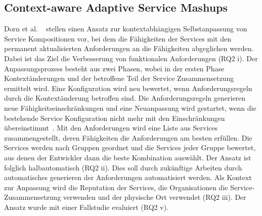 \documentclass[conference,compsoc]{IEEEtran}
\begin{document}
\subsection{Context-aware Adaptive Service Mashups}
Dorn et al. ~\cite{dorn2009context} stellen einen Ansatz zur kontextabhängigen Selbstanpassung von Service Kompositionen vor, bei dem die Fähigkeiten der Services mit den permanent aktualisierten Anforderungen an die Fähigkeiten abgeglichen werden. Dabei ist das Ziel die Verbesserung von funktionalen Anforderungen (RQ2 i). Der Anpassungsprozess besteht aus zwei Phasen, wobei in der ersten Phase Kontextänderungen und der betroffene Teil der Service Zusammensetzung ermittelt wird. Eine Konfiguration wird neu bewertet, wenn Anforderungsregeln durch die Kontextänderung betroffen sind. Die Anforderungsregeln generieren neue Fähigkeitseinschränkungen und eine Neuanpassung wird gestartet, wenn die bestehende Service Konfiguration nicht mehr mit den Einschränkungen übereinstimmt~\cite{dorn2009context}. Mit den Anforderungen wird eine Liste aus Services zusammengestellt, deren Fähigkeiten die Anforderungen am besten erfüllen. Die Services werden nach Gruppen geordnet und die Services jeder Gruppe bewertet, aus denen der Entwickler dann die beste Kombination auswählt. Der Ansatz ist folglich halbautomatisch (RQ2 ii). Dies soll durch zukünftige Arbeiten durch automatisches generieren der Anforderungen automatisiert werden.
Als Kontext zur Anpassung wird die Reputation der Services, die Organisationen die Service-Zusammensetzung verwenden und der physische Ort verwendet (RQ2 iii).
Der Ansatz wurde mit einer Fallstudie evaluiert (RQ2 v).
\end{document}
